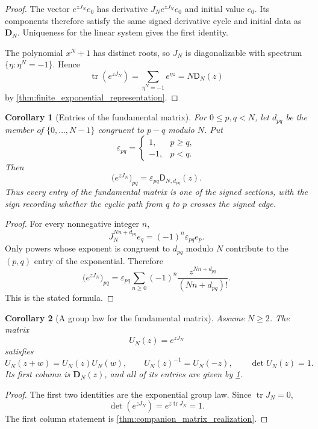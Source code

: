 \documentclass{aomart}
\newtheorem{corollary}[corollary]{Corollary}
\theoremstyle{definition}
\theoremstyle{remark}
\newcommand{\Dfun}{\mathsf D}
\newcommand{\tr}{\operatorname{tr}}
\begin{document}
\begin{proof}
The vector $e^{zJ_N}e_0$ has derivative $J_Ne^{zJ_N}e_0$ and initial value $e_0$.  Its components therefore satisfy the same signed derivative cycle and initial data as $\mathbf D_N$.  Uniqueness for the linear system gives the first identity.

The polynomial $x^N+1$ has distinct roots, so $J_N$ is diagonalizable with spectrum $\{\eta:\eta^N=-1\}$.  Hence
\[
\tr(e^{zJ_N})
=
\sum_{\eta^N=-1}e^{\eta z}
=
N\Dfun_N(z)
\]
by \cref{thm:finite_exponential_representation}.
\end{proof}

\begin{corollary}[Entries of the fundamental matrix]\label{cor:fundamental_matrix_entries}
For $0\leq p,q<N$, let $d_{pq}$ be the member of $\{0,\ldots,N-1\}$ congruent to $p-q$ modulo $N$.  Put
\[
\varepsilon_{pq}
=
\begin{cases}
1,&p\geq q,\\
-1,&p<q.
\end{cases}
\]
Then
\[
\bigl(e^{zJ_N}\bigr)_{pq}
=
\varepsilon_{pq}\Dfun_{N,d_{pq}}(z).
\]
Thus every entry of the fundamental matrix is one of the signed sections, with the sign recording whether the cyclic path from $q$ to $p$ crosses the signed edge.
\end{corollary}

\begin{proof}
For every nonnegative integer $n$,
\[
J_N^{Nn+d_{pq}}e_q
=
(-1)^n\varepsilon_{pq}e_p.
\]
Only powers whose exponent is congruent to $d_{pq}$ modulo $N$ contribute to the $(p,q)$ entry of the exponential.  Therefore
\[
\bigl(e^{zJ_N}\bigr)_{pq}
=
\varepsilon_{pq}
\sum_{n\geq0}(-1)^n
\frac{z^{Nn+d_{pq}}}{(Nn+d_{pq})!}.
\]
This is the stated formula.
\end{proof}

\begin{corollary}[A group law for the fundamental matrix]\label{cor:fundamental_matrix_group_law}
Assume $N\geq2$.  The matrix
\[
U_N(z)=e^{zJ_N}
\]
satisfies
\[
U_N(z+w)=U_N(z)U_N(w),
\qquad
U_N(z)^{-1}=U_N(-z),
\qquad
\det U_N(z)=1.
\]
Its first column is $\mathbf D_N(z)$, and all of its entries are given by \cref{cor:fundamental_matrix_entries}.
\end{corollary}

\begin{proof}
The first two identities are the exponential group law.  Since $\tr J_N=0$,
\[
\det(e^{zJ_N})=e^{z\tr J_N}=1.
\]
The first column statement is \cref{thm:companion_matrix_realization}.
\end{proof}
\end{document}
